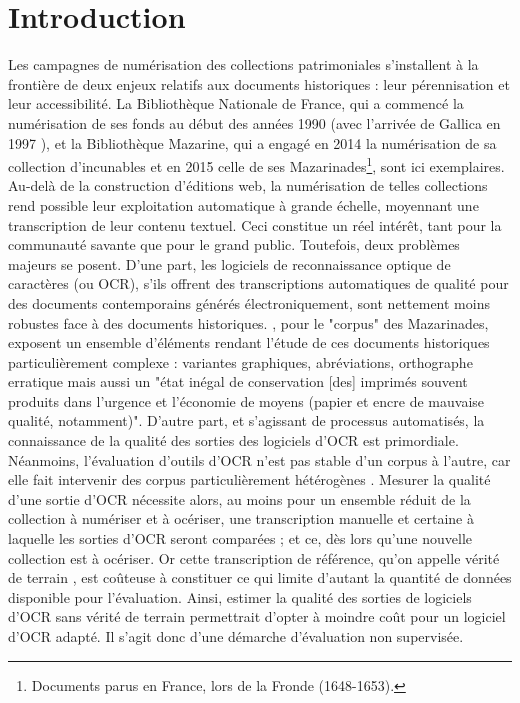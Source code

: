 \documentclass[10pt,twoside]{article}
\begin{document}
\section{Introduction}
Les campagnes de numérisation des collections patrimoniales s'installent à la frontière de deux enjeux relatifs aux 
documents historiques : leur pérennisation et leur accessibilité. La Bibliothèque Nationale de France, qui a commencé la 
numérisation de ses fonds au début des années 1990 (avec l'arrivée de Gallica en 1997 \cite{Bermes2020a}), et la Bibliothèque Mazarine, 
qui a engagé en 2014 la numérisation de sa collection d'incunables et en 2015 celle de ses Mazarinades\footnote{Documents parus en France, lors de la Fronde (1648-1653).}, sont ici exemplaires. 
Au-delà de la construction d'éditions web, la numérisation de telles collections rend possible leur exploitation automatique 
à grande échelle, moyennant une transcription de leur contenu textuel. Ceci constitue un réel intérêt, tant pour la communauté
savante que pour le grand public. Toutefois, deux problèmes majeurs se posent. D'une part, les logiciels 
de reconnaissance optique de caractères (ou OCR), s'ils offrent des transcriptions automatiques de qualité pour des 
documents contemporains générés électroniquement, sont nettement moins robustes face à des documents historiques. 
\cite{Lejeune2019a}, pour le "corpus" des Mazarinades,
exposent un ensemble d'éléments rendant l'étude de ces documents historiques particulièrement complexe : variantes graphiques,
abréviations, orthographe erratique mais aussi un "état inégal de conservation [des] imprimés souvent produits dans l’urgence et l’économie de moyens (papier et encre de mauvaise qualité, notamment)". D'autre part, et s'agissant de
processus automatisés, la connaissance de la qualité des sorties des logiciels d'OCR est primordiale. Néanmoins, l'évaluation
d'outils d'OCR n'est pas stable d'un corpus à l'autre, car elle fait intervenir des corpus particulièrement hétérogènes
\cite{Springmann2014a}. Mesurer la qualité d'une sortie d'OCR nécessite alors, au moins pour un ensemble réduit de la 
collection à numériser et à océriser, une transcription manuelle et certaine à laquelle les sorties d'OCR seront comparées ; 
et ce, dès lors qu'une nouvelle collection est à océriser. Or cette transcription de référence, qu'on appelle vérité de terrain \cite{Springmann2018a}, est coûteuse à constituer ce 
qui limite d'autant la quantité de données disponible pour l'évaluation. Ainsi, estimer la qualité des sorties de logiciels 
d'OCR sans vérité de terrain permettrait d'opter à moindre coût pour un logiciel d'OCR adapté. Il s'agit donc 
d'une démarche d'évaluation non supervisée.
\end{document}
